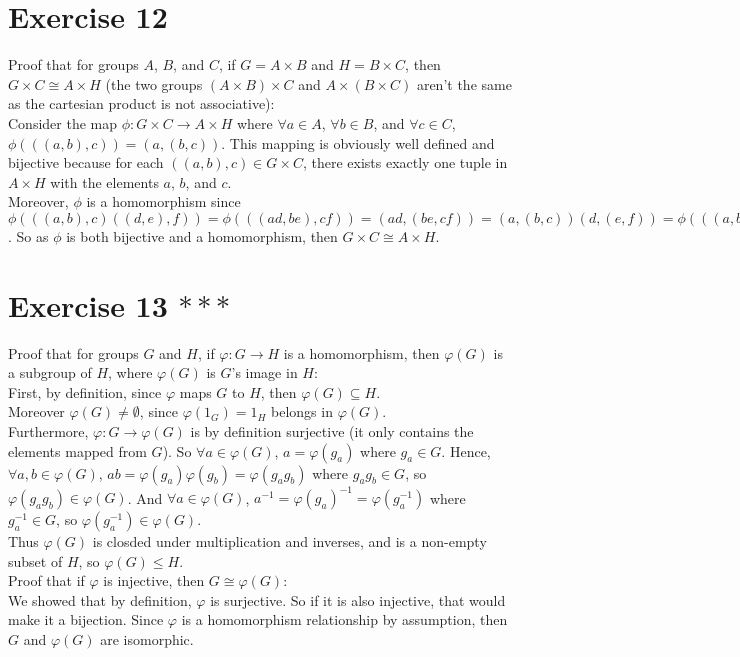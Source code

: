 \documentclass[12pt]{article}
\begin{document}
    \section*{Exercise 12}
    Proof that for groups $A$, $B$, and $C$, if $G = A \times B$
    and $H = B \times C$, then $G \times C \cong A \times H$
    (the two groups $(A \times B) \times C$ and $A \times (B \times C)$
    aren't the same as the cartesian product is not associative): \\
    Consider the map $\phi: G \times C \to A \times H$
    where $\forall a \in A$, $\forall b \in B$, and $\forall c \in C$,
    $\phi(((a, b), c)) = (a, (b, c))$.
    This mapping is obviously well defined and bijective
    because for each $((a, b), c) \in G \times C$,
    there exists exactly one tuple in $A \times H$ with the elements
    $a$, $b$, and $c$. \\
    Moreover, $\phi$ is a homomorphism 
    since $\phi(((a, b), c)((d, e), f)) = \phi(((ad, be), cf))
    = (ad, (be, cf))
    = (a, (b, c))(d, (e, f))
    = \phi(((a, b), c))\phi(((d, e), f))$.
    So as $\phi$ is both bijective and a homomorphism,
    then $G \times C \cong A \times H$.


    \section*{Exercise 13 $***$}
    Proof that for groups $G$ and $H$,
    if $\varphi: G \to H$ is a homomorphism,
    then $\varphi(G)$ is a subgroup of $H$,
    where $\varphi(G)$ is $G$'s image in $H$: \\
    First, by definition, since $\varphi$ maps $G$ to $H$,
    then $\varphi(G) \subseteq H$. \\
    Moreover $\varphi(G) \neq \emptyset$,
    since $\varphi(1_G) = 1_H$ belongs in $\varphi(G)$. \\
    Furthermore, $\varphi: G \to \varphi(G)$ is by definition surjective
    (it only contains the elements mapped from $G$).
    So $\forall a \in \varphi(G)$, $a = \varphi(g_a)$ where $g_a \in G$.
    Hence, $\forall a, b \in \varphi(G)$,
    $ab = \varphi(g_a)\varphi(g_b) = \varphi(g_ag_b)$
    where $g_ag_b \in G$,
    so $\varphi(g_ag_b) \in \varphi(G)$.
    And $\forall a \in \varphi(G)$,
    $a^{-1} = \varphi(g_a)^{-1} = \varphi(g_a^{-1})$
    where $g_a^{-1} \in G$,
    so $\varphi(g_a^{-1}) \in \varphi(G)$. \\
    Thus $\varphi(G)$ is closded under multiplication and inverses,
    and is a non-empty subset of $H$,
    so $\varphi(G) \leqslant H$. \\
    Proof that if $\varphi$ is injective, then $G \cong \varphi(G)$: \\
    We showed that by definition, $\varphi$ is surjective.
    So if it is also injective, that would make it a bijection.
    Since $\varphi$ is a homomorphism relationship by assumption,
    then $G$ and $\varphi(G)$ are isomorphic.
\end{document}
